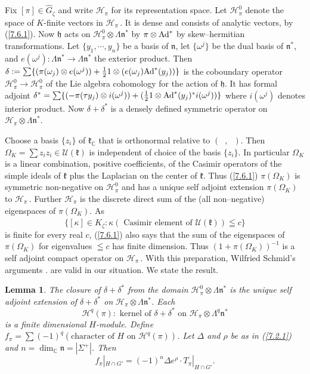\documentclass{conm-p-l}
\newtheorem{lemma}[equation]{Lemma}
\def\gh{\mathfrak{h}}
\def\gk{\mathfrak{k}}
\def\gn{\mathfrak{n}}
\def\Ad{{\rm Ad}}
\def\C{\mathbb{C}}
\def\cH{\mathcal{H}}
\def\cU{\mathcal{U}}
\begin{document}
Fix $[\pi] \in \widehat{G}_\zeta$ and write $\cH_\pi$ for its
representation space.  Let $\cH_\pi^0$  denote the space
of $K$-finite vectors in $\cH_\pi$\,. It is dense and consists of
analytic vectors, by (\ref{7.6.1}).  Now $\gh$ acts on 
	$\cH_\pi^0\otimes \Lambda\gn^*$ by $\pi \otimes \Ad^*$
by skew--hermitian transformations.  Let 
$\{y_1,\cdots , y_n\}$ be a basis of $\gn$, let $\{\omega^j\}$ be the dual
basis of $\gn^*$, and $e(\omega^j): \Lambda\gn^* \to \Lambda\gn^*$
the exterior product.  Then $\delta := 
	\sum \{(\pi(\omega_j) \otimes e(\omega^j)) + \frac{1}{2}1 \otimes
		(e(\omega_j)\Ad^*(y_j))\}$
is the coboundary operator $\cH_\pi^0 \to \cH_\pi^0$ of the Lie algebra
cohomology for the action of $\gh$.  It has formal adjoint 
$\delta^* = \sum \{(-\pi(\tau y_j)\otimes i(\omega^j)) + (\frac{1}{2}1 \otimes
		\Ad^*(y_j)^* i(\omega^j))\}$ 
where $i(\omega^j)$ denotes interior product.  Now $\delta + \delta^*$ is
a densely defined symmetric operator on $\cH_\pi \otimes \Lambda \gn^*$.

Choose a basis $\{z_i\}$ of $\gk_\C$ that is orthonormal relative to
$(\phantom{x},\phantom{x})$.  Then $\Omega_K = \sum z_iz_i \in \cU(\gk)$
is independent of choice of the basis $\{z_i\}$.  In particular
$\Omega_K$ is a linear combination, positive coefficients, of the
Casimir operators of the simple ideals of $\gk$ plus the Laplacian
on the center of $\gk$.  Thus (\ref{7.6.1})  $\pi(\Omega_K)$ is symmetric
non-negative on $\cH_\pi^0$ and has a unique self adjoint extension
$\pi(\Omega_K)$ to $\cH_\pi$\,.  Further $\cH_\pi$ is the discrete
direct sum of the (all non--negative) eigenspaces of $\pi(\Omega_K)$.  As
$$
\{ [\kappa] \in \widehat{K}_\zeta :
	\kappa(\text{ Casimir element of } \cU(\gk)) \leqq c\}
$$
is finite for every real $c$, (\ref{7.6.1}) also says that the sum of the 
eigenspaces of $\pi(\Omega_K)$ for eigenvalues $\leqq c$ has finite
dimension.  Thus 
$(1 + \pi(\Omega_K))^{-1}$ is a
	self adjoint compact operator on $\cH_\pi$\,.
With this preparation, Wilfried Schmid's arguments \cite[\S 3]{S1971}.
are valid in our situation.  We state the result.

\begin{lemma}\label{7.6.4}
The closure of $\delta + \delta^*$ from the
domain $\cH_\pi^0 \otimes \Lambda\gn^*$ is the unique self adjoint extension
of $\delta + \delta^*$ on $\cH_\pi \otimes \Lambda\gn^*$.  Each
$$
\cH^q(\pi): \text{ kernel of }
	\delta + \delta^* \text{ on } \cH_\pi \otimes \Lambda^q \gn^*
$$
is a finite dimensional $H$-module.  Define 
$f_\pi = \sum (-1)^q
	(\text{character of } H \text{ on } \cH^q(\pi))$.
Let $\Delta$ and $\rho$ be as in {\rm (\ref{7.2.1})} and $n = \dim_\C\gn = 
|\Sigma^+|$.  Then 
$$
f_\pi|_{H \cap G'} =
	(-1)^n \Delta e^\rho\cdot T_\pi|_{H\cap G'}.
$$
\end{lemma}
\end{document}
